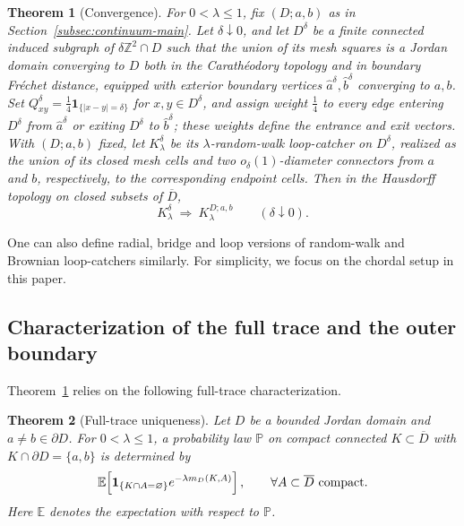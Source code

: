 \documentclass[11pt]{article}
\numberwithin{equation}{section}
\newcommand{\Z}{\mathbb{Z}}
\newcommand{\E}{\mathbb{E}}
\newcommand{\1}{\mathbf{1}}
\renewcommand{\P}{\mathbb{P}}
\newtheorem{theorem}{Theorem}[section]
\newcommand\ol[1]{\overline{#1}}
\newcommand{\one}{\mathbf 1}
\begin{document}
\begin{theorem}[Convergence]\label{thm:catcher-convergence}
For \(0<\lambda\leq1\), fix \((D;a,b)\) as in Section~\ref{subsec:continuum-main}.  Let \(\delta\downarrow0\), and let
\(D^\delta\) be a finite connected induced subgraph of
\(\delta\Z^2\cap D\) such that the union of its mesh squares is a Jordan domain converging
to \(D\) both in the Carath\'eodory topology and in boundary Fr\'echet
  distance, equipped with exterior boundary vertices
  \(\widehat a^\delta,\widehat b^\delta\) converging to 
  \(a,b\).  Set \(Q^\delta_{xy}=\frac14\one_{\{|x-y|=\delta\}}\) for
\(x,y\in D^\delta\), and assign weight \(\frac14\) to every edge entering
\(D^\delta\) from \(\widehat a^\delta\) or exiting \(D^\delta\) to
\(\widehat b^\delta\); these weights define the entrance and exit
vectors.  
  With \((D;a,b)\) fixed, let \(K_\lambda^\delta\) be its 
\(\lambda\)-random-walk loop-catcher on $D^\delta$, realized as the union of its closed mesh cells
  and two \(o_\delta(1)\)-diameter connectors from \(a\) and \(b\), respectively, to the corresponding endpoint cells.
Then in the Hausdorff topology on closed subsets of $\ol D$,
\[
 K_\lambda^{\delta}\ \Longrightarrow\ K_\lambda^{D;a,b}
 \qquad(\delta\downarrow0).
\]
\end{theorem}

One can also define radial, bridge and loop versions of random-walk and Brownian loop-catchers similarly. For simplicity, we focus on the chordal setup in this paper.

\subsection{Characterization of the full trace and the outer boundary}\label{subsec:identify-sle}

Theorem~\ref{thm:catcher-convergence} relies on the following
full-trace characterization.
\begin{theorem}[Full-trace uniqueness]\label{thm:full-trace-unique}
Let \(D\) be a bounded Jordan domain and \(a\ne b\in\partial D\).
For \(0<\lambda\leq1\), a probability law $\P$ on compact connected
\(K\subset\overline D\) with \(K\cap\partial D=\{a,b\}\) is determined by
\begin{equation}
 \E\!\left[
 \one_{\{K\cap A=\varnothing\}}e^{-\lambda m_D(K,A)}\right],
 \qquad \forall A\subset \ol D\ \hbox{compact}.
\end{equation}
Here $\E$ denotes the expectation with respect to $\P$.
\end{theorem}
\end{document}
